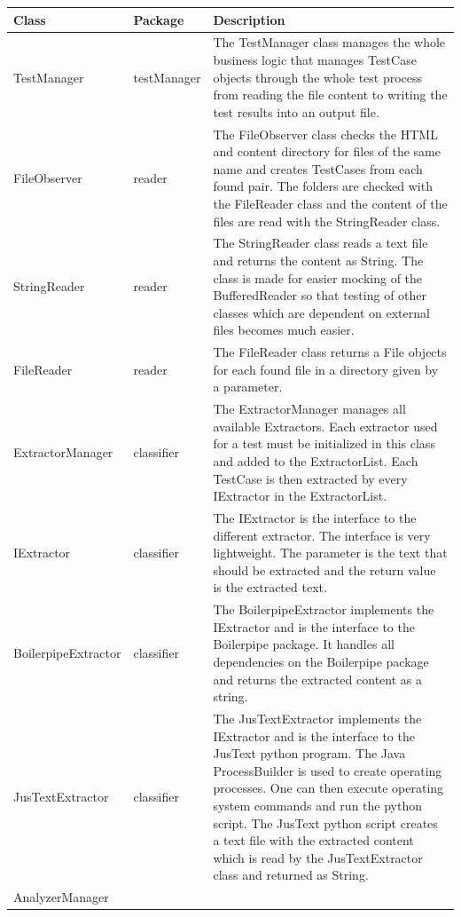 \begin{longtable}{p{4cm}|p{2cm}|p{8cm}}
\hline
\textbf{Class} &
\textbf{Package} &
\textbf{Description}
 \\ \hline
TestManager &
testManager &
The TestManager class manages the whole business logic that manages TestCase objects through the whole test process from reading the file content to writing the test results into an output file.
 \\ \hline
FileObserver &
reader &
The FileObserver class checks the HTML and content directory for files of the same name and creates TestCases from each found pair. The folders are checked with the FileReader class and the content of the files are read with the StringReader class.
\\ \hline
StringReader &
reader &
The StringReader class reads a text file and returns the content as String. The class is made for easier mocking of the BufferedReader so that testing of other classes which are dependent on external files becomes much easier.
\\ \hline
FileReader &
reader &
The FileReader class returns a File objects for each found file in a directory given by a parameter.
\\ \hline
ExtractorManager &
classifier &
The ExtractorManager manages all available Extractors. Each extractor used for a test must be initialized in this class and added to the ExtractorList. Each TestCase is then extracted by every IExtractor in the ExtractorList.
\\ \hline
IExtractor &
classifier &
The IExtractor is the interface to the different extractor. The interface is very lightweight. The parameter is the text that should be extracted and the return value is the extracted text.
\\ \hline
BoilerpipeExtractor &
classifier &
The BoilerpipeExtractor implements the IExtractor and is the interface to the Boilerpipe package. It handles all dependencies on the Boilerpipe package and returns the extracted content as a string.
\\ \hline
JusTextExtractor &
classifier &
The JusTextExtractor implements the IExtractor and is the interface to the JusText python program. The Java ProcessBuilder is used to create operating processes. One can then execute operating system commands and run the python script. The JusText python script creates a text file with the extracted content which is read by the JusTextExtractor class and returned as String.
\\ \hline
AnalyzerManager &          

\end{longtable}
